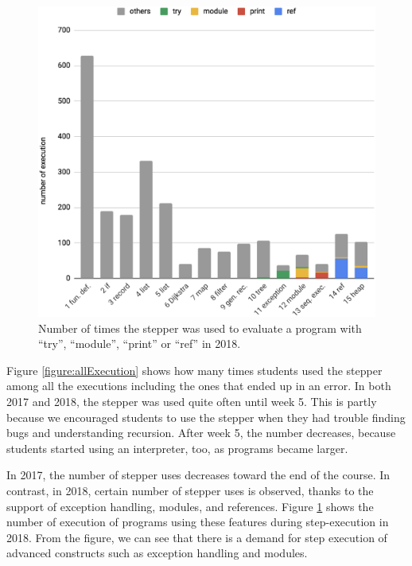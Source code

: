 \begin{figure}[!t]
  \begin{center}
    \includegraphics[width=15cm]{5/table1b.eps}
    \caption{Number of times the stepper was used to evaluate a program with ``try'', ``module'', ``print'' or ``ref'' in 2018.}
    \label{figure:stepExecution}
  \end{center}
\end{figure}

Figure \ref{figure:allExecution} shows how many times students used the stepper among all the executions including the ones that ended up in an error.
In both 2017 and 2018, the stepper was used quite often until week 5.
This is partly because
we encouraged students to use the stepper when they had
trouble finding bugs and understanding recursion.
After week 5, the number decreases, because students started using an
interpreter, too, as programs became larger.

In 2017, the number of stepper uses decreases toward the end of the
course.
In contrast, in 2018, certain number of stepper uses is observed,
thanks to the support of exception handling, modules, and references.
Figure \ref{figure:stepExecution} shows the number of execution of programs using these features during step-execution in 2018. %
From the figure, we can see that there is a demand for step
execution of advanced constructs such as exception handling and
modules.


